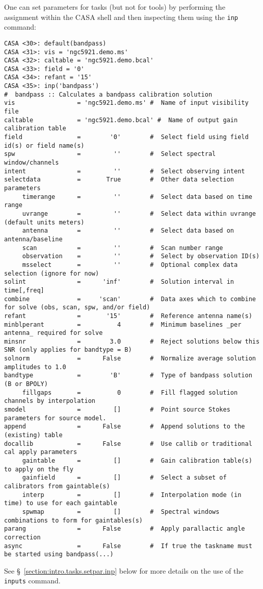 One can set parameters for tasks (but not for tools) by
performing the assignment within the CASA shell and then inspecting
them using the {\tt inp} command:
\small
\begin{verbatim}
CASA <30>: default(bandpass)
CASA <31>: vis = 'ngc5921.demo.ms'
CASA <32>: caltable = 'ngc5921.demo.bcal'
CASA <33>: field = '0'
CASA <34>: refant = '15'
CASA <35>: inp('bandpass')
#  bandpass :: Calculates a bandpass calibration solution
vis                 = 'ngc5921.demo.ms' #  Name of input visibility file
caltable            = 'ngc5921.demo.bcal' #  Name of output gain calibration table
field               =        '0'        #  Select field using field id(s) or field name(s)
spw                 =         ''        #  Select spectral window/channels
intent              =         ''        #  Select observing intent
selectdata          =       True        #  Other data selection parameters
     timerange      =         ''        #  Select data based on time range
     uvrange        =         ''        #  Select data within uvrange (default units meters)
     antenna        =         ''        #  Select data based on antenna/baseline
     scan           =         ''        #  Scan number range
     observation    =         ''        #  Select by observation ID(s)
     msselect       =         ''        #  Optional complex data selection (ignore for now)
solint              =      'inf'        #  Solution interval in time[,freq]
combine             =     'scan'        #  Data axes which to combine for solve (obs, scan, spw, and/or field)
refant              =       '15'        #  Reference antenna name(s)
minblperant         =          4        #  Minimum baselines _per antenna_ required for solve
minsnr              =        3.0        #  Reject solutions below this SNR (only applies for bandtype = B)
solnorm             =      False        #  Normalize average solution amplitudes to 1.0
bandtype            =        'B'        #  Type of bandpass solution (B or BPOLY)
     fillgaps       =          0        #  Fill flagged solution channels by interpolation
smodel              =         []        #  Point source Stokes parameters for source model.
append              =      False        #  Append solutions to the (existing) table
docallib            =      False        #  Use callib or traditional cal apply parameters
     gaintable      =         []        #  Gain calibration table(s) to apply on the fly
     gainfield      =         []        #  Select a subset of calibrators from gaintable(s)
     interp         =         []        #  Interpolation mode (in time) to use for each gaintable
     spwmap         =         []        #  Spectral windows combinations to form for gaintables(s)
parang              =      False        #  Apply parallactic angle correction
async               =      False        #  If true the taskname must be started using bandpass(...)
\end{verbatim}
\normalsize
See \S~\ref{section:intro.tasks.setpar.inp} below for more details on
the use of the {\tt inputs} command.

